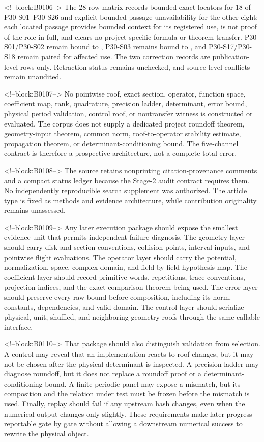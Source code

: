 \documentclass[11pt,a4paper]{article}
\begin{document}
<!--block:B0106-->
The 28-row matrix records bounded exact locators for 18 of
P30-S01--P30-S26 and explicit bounded passage unavailability for the other eight;
each located passage provides bounded context for its registered use, is not
proof of the role in full, and clears no project-specific formula or theorem
transfer.  P30-S01/P30-S02 remain bound to
\citep{P30-C01}, P30-S03 remains bound to \citep{P30-C02}, and
P30-S17/P30-S18 remain paired for affected use.  The two correction records are
publication-level rows only.  Retraction status remains unchecked, and
source-level conflicts remain unaudited.

<!--block:B0107-->
No pointwise roof, exact section, operator, function space, coefficient map, rank, quadrature, precision ladder, determinant, error bound, physical period validation, control roof, or nontransfer witness is constructed or evaluated. The corpus does not supply a dedicated project roundoff theorem, geometry-input theorem, common norm, roof-to-operator stability estimate, propagation theorem, or determinant-conditioning bound. The five-channel contract is therefore a prospective architecture, not a complete total error.

<!--block:B0108-->
The source retains nonprinting citation-provenance comments and a compact status ledger because the Stage-2 audit contract requires them. No independently reproducible search supplement was authorized. The article type is fixed as methods and evidence architecture, while contribution originality remains unassessed.

<!--block:B0109-->
Any later execution package should expose the smallest evidence unit that permits independent failure diagnosis. The geometry layer should carry disk and section conventions, collision points, interval inputs, and pointwise flight evaluations. The operator layer should carry the potential, normalization, space, complex domain, and field-by-field hypothesis map. The coefficient layer should record primitive words, repetitions, trace conventions, projection indices, and the exact comparison theorem being used. The error layer should preserve every raw bound before composition, including its norm, constants, dependencies, and valid domain. The control layer should serialize physical, unit, shuffled, and neighboring-geometry roofs through the same callable interface.

<!--block:B0110-->
That package should also distinguish validation from selection. A control may reveal that an implementation reacts to roof changes, but it may not be chosen after the physical determinant is inspected. A precision ladder may diagnose roundoff, but it does not replace a roundoff proof or a determinant-conditioning bound. A finite periodic panel may expose a mismatch, but its composition and the relation under test must be frozen before the mismatch is used. Finally, replay should fail if any upstream hash changes, even when the numerical output changes only slightly. These requirements make later progress reportable gate by gate without allowing a downstream numerical success to rewrite the physical object.
\end{document}
